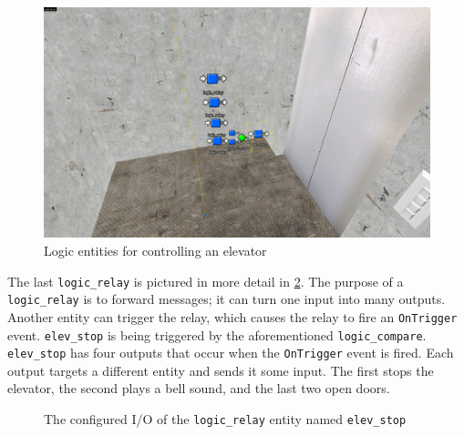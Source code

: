 \documentclass[a4paper, 12pt]{scrartcl}
\begin{document}
\begin{figure}[!ht]
  \centering
  \includegraphics[width=0.75\linewidth]{images/source_io_entities.png}
  \caption{Logic entities for controlling an elevator}
  \label{fig:source_entities}
\end{figure}

The last \texttt{logic\_relay} is pictured in more detail in \cref{fig:source_elev_stop}. The purpose of a \texttt{logic\_relay} is to forward messages; it can turn one input into many outputs. Another entity can trigger the relay, which causes the relay to fire an \texttt{OnTrigger} event. \texttt{elev\_stop} is being triggered by the aforementioned \texttt{logic\_compare}. \texttt{elev\_stop} has four outputs that occur when the \texttt{OnTrigger} event is fired. Each output targets a different entity and sends it some input. The first stops the elevator, the second plays a bell sound, and the last two open doors.

\begin{figure}[!ht]
  \centering
  \qquad
  \caption{The configured I/O of the \texttt{logic\_relay} entity named \texttt{elev\_stop}}
  \label{fig:source_elev_stop}
\end{figure}
\end{document}

